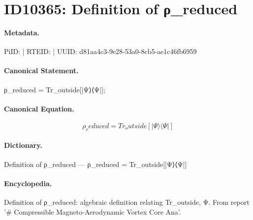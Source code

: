 \section*{ID10365: Definition of ρ\_reduced}
\paragraph{Metadata.}
PiID:  | RTEID:  | UUID: d81aa4c3-9e28-53a0-8cb5-ae1c46fb6959

\paragraph{Canonical Statement.}
ρ\_reduced = Tr\_outside[|Ψ⟩⟨Ψ|];

\paragraph{Canonical Equation.}
\[
ρ_reduced = Tr_outside[|Ψ⟩⟨Ψ|]
\]

\paragraph{Dictionary.}
Definition of ρ\_reduced — ρ\_reduced = Tr\_outside[|Ψ⟩⟨Ψ|]

\paragraph{Encyclopedia.}
Definition of ρ\_reduced: algebraic definition relating Tr\_outside, Ψ. From report '\# Compressible Magneto-Aerodynamic Vortex Core Ana'.
